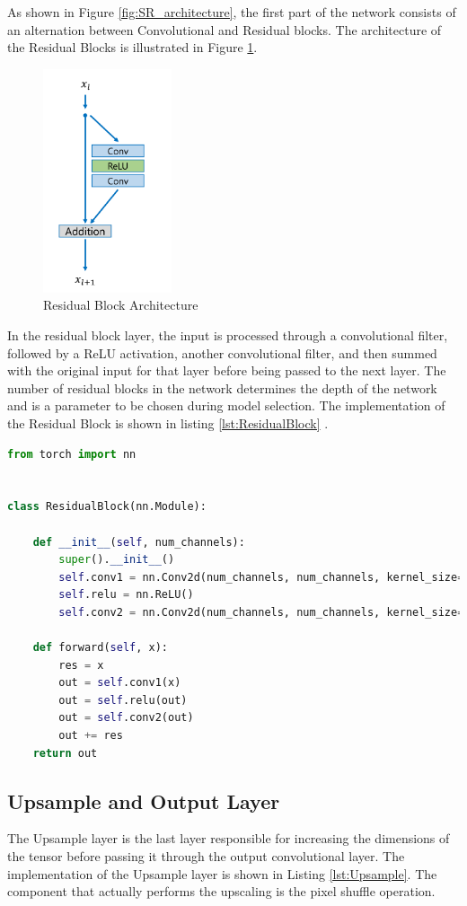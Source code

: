 \documentclass[../report.tex]{subfiles}
\begin{document}
As shown in Figure \ref{fig:SR_architecture}, the first part of the network consists of an alternation between Convolutional and Residual blocks. The architecture of the Residual Blocks is illustrated in Figure \ref{fig:ResidualBlock_architecture}.
\begin{figure}[H]
	\caption{Residual Block Architecture}
	\centering
	\label{fig:ResidualBlock_architecture}
	\includegraphics[scale=0.5]{../images/ResidualBlock.png}
\end{figure}
In the residual block layer, the input is processed through a convolutional filter, followed by a ReLU activation, another convolutional filter, and then summed with the original input for that layer before being passed to the next layer. The number of residual blocks in the network determines the depth of the network and is a parameter to be chosen during model selection.
The implementation of the Residual Block is shown in listing \ref{lst:ResidualBlock} .

\begin{lstlisting}[style=python,language=python, label={lst:ResidualBlock},caption={Residual Block implementation}]
from torch import nn


class ResidualBlock(nn.Module):

	def __init__(self, num_channels):
		super().__init__()
		self.conv1 = nn.Conv2d(num_channels, num_channels, kernel_size=3, padding=1)
		self.relu = nn.ReLU()
		self.conv2 = nn.Conv2d(num_channels, num_channels, kernel_size=3, padding=1)
	
	def forward(self, x):
		res = x
		out = self.conv1(x)
		out = self.relu(out)
		out = self.conv2(out)
		out += res
	return out
\end{lstlisting}

\subsection{Upsample and Output Layer}
The Upsample layer is the last layer responsible for increasing the dimensions of the tensor before passing it through the output convolutional layer. The implementation of the Upsample layer is shown in Listing \ref{lst:Upsample}. The component that actually performs the upscaling is the pixel shuffle operation.
\end{document}
